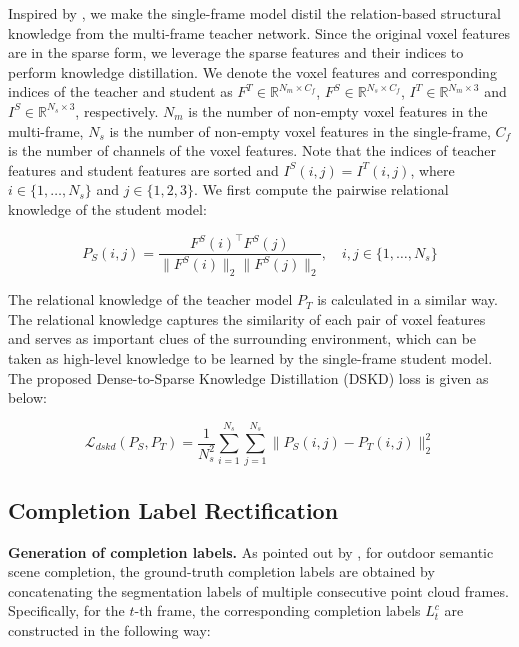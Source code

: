 \documentclass[10pt,twocolumn,letterpaper]{article}
\begin{document}
Inspired by \cite{luisroldao2018}, we make the single-frame model distil the relation-based structural knowledge from the multi-frame teacher network. Since the original voxel features are in the sparse form, we leverage the sparse features and their indices to perform knowledge distillation. We denote the voxel features and corresponding indices of the teacher and student as $F^T \in \mathbb{R}^{N_m \times C_f}$, $F^S \in \mathbb{R}^{N_s \times C_f}$, $I^T \in \mathbb{R}^{N_m \times 3}$ and $I^S \in \mathbb{R}^{N_s \times 3}$, respectively. $N_m$ is the number of non-empty voxel features in the multi-frame, $N_s$ is the number of non-empty voxel features in the single-frame, $C_f$ is the number of channels of the voxel features. Note that the indices of teacher features and student features are sorted and $I^S(i,j) = I^T(i,j)$, where $i \in \{1,\ldots,N_s\}$ and $j \in \{1,2,3\}$. We first compute the pairwise relational knowledge of the student model:

\begin{equation}
  P_S(i,j) = \frac{F^S(i)^\top F^S(j)}{\|F^S(i)\|_2 \|F^S(j)\|_2}, \quad i,j \in \{1,\ldots,N_s\}
  \label{eq:pairwise}
\end{equation}

The relational knowledge of the teacher model $P_T$ is calculated in a similar way. The relational knowledge captures the similarity of each pair of voxel features and serves as important clues of the surrounding environment, which can be taken as high-level knowledge to be learned by the single-frame student model. The proposed Dense-to-Sparse Knowledge Distillation (DSKD) loss is given as below:

\begin{equation}
  \mathcal{L}_{dskd}(P_S, P_T) = \frac{1}{N_s^2} \sum_{i=1}^{N_s} \sum_{j=1}^{N_s} \|P_S(i,j) - P_T(i,j)\|_2^2
  \label{eq:dskd}
\end{equation}

\subsection{Completion Label Rectification}

\textbf{Generation of completion labels.}
As pointed out by \cite{haotiantang2020}, for outdoor semantic scene completion, the ground-truth completion labels are obtained by concatenating the segmentation labels of multiple consecutive point cloud frames. Specifically, for the $t$-th frame, the corresponding completion labels $L^c_t$ are constructed in the following way:
\end{document}
